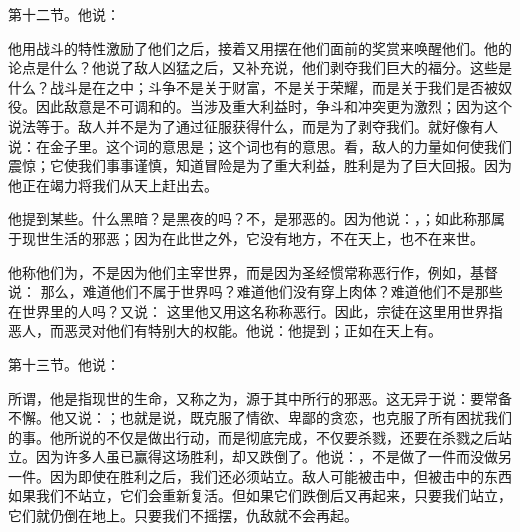 第十二节。他说：\par

他用战斗的特性激励了他们之后，接着又用摆在他们面前的奖赏来唤醒他们。他的论点是什么？他说了敌人凶猛之后，又补充说，他们剥夺我们巨大的福分。这些是什么？战斗是在之中；斗争不是关于财富，不是关于荣耀，而是关于我们是否被奴役。因此敌意是不可调和的。当涉及重大利益时，争斗和冲突更为激烈；因为这个说法等于。敌人并不是为了通过征服获得什么，而是为了剥夺我们。就好像有人说：在金子里。这个词的意思是；这个词也有的意思。看，敌人的力量如何使我们震惊；它使我们事事谨慎，知道冒险是为了重大利益，胜利是为了巨大回报。因为他正在竭力将我们从天上赶出去。\par

他提到某些。什么黑暗？是黑夜的吗？不，是邪恶的。因为他说：，；如此称那属于现世生活的邪恶；因为在此世之外，它没有地方，不在天上，也不在来世。\par

他称他们为，不是因为他们主宰世界，而是因为圣经惯常称恶行作，例如，基督说： 那么，难道他们不属于世界吗？难道他们没有穿上肉体？难道他们不是那些在世界里的人吗？又说： 这里他又用这名称称恶行。因此，宗徒在这里用世界指恶人，而恶灵对他们有特别大的权能。他说：他提到；正如在天上有。\par

第十三节。他说：\par

所谓，他是指现世的生命，又称之为，源于其中所行的邪恶。这无异于说：要常备不懈。他又说：；也就是说，既克服了情欲、卑鄙的贪恋，也克服了所有困扰我们的事。他所说的不仅是做出行动，而是彻底完成，不仅要杀戮，还要在杀戮之后站立。因为许多人虽已赢得这场胜利，却又跌倒了。他说：，不是做了一件而没做另一件。因为即使在胜利之后，我们还必须站立。敌人可能被击中，但被击中的东西如果我们不站立，它们会重新复活。但如果它们跌倒后又再起来，只要我们站立，它们就仍倒在地上。只要我们不摇摆，仇敌就不会再起。\par

